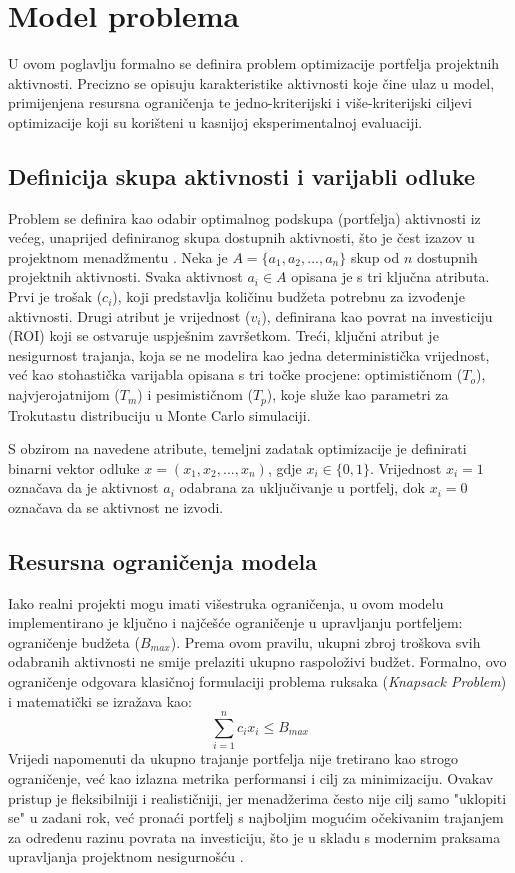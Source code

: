 \section{Model problema}
\label{chap:model_problema}

U ovom poglavlju formalno se definira problem optimizacije portfelja projektnih aktivnosti. Precizno se opisuju karakteristike aktivnosti koje čine ulaz u model, primijenjena resursna ograničenja te jedno-kriterijski i više-kriterijski ciljevi optimizacije koji su korišteni u kasnijoj eksperimentalnoj evaluaciji.

\subsection{Definicija skupa aktivnosti i varijabli odluke}
Problem se definira kao odabir optimalnog podskupa (portfelja) aktivnosti iz većeg, unaprijed definiranog skupa dostupnih aktivnosti, što je čest izazov u projektnom menadžmentu \cite{PMI2021, Kerzner2017}. Neka je $A=\{a_1, a_2, ..., a_n\}$ skup od $n$ dostupnih projektnih aktivnosti. Svaka aktivnost $a_i \in A$ opisana je s tri ključna atributa. Prvi je trošak ($c_i$), koji predstavlja količinu budžeta potrebnu za izvođenje aktivnosti. Drugi atribut je vrijednost ($v_i$), definirana kao povrat na investiciju (ROI) koji se ostvaruje uspješnim završetkom. Treći, ključni atribut je nesigurnost trajanja, koja se ne modelira kao jedna deterministička vrijednost, već kao stohastička varijabla opisana s tri točke procjene: optimističnom ($T_o$), najvjerojatnijom ($T_m$) i pesimističnom ($T_p$), koje služe kao parametri za Trokutastu distribuciju u Monte Carlo simulaciji.

S obzirom na navedene atribute, temeljni zadatak optimizacije je definirati binarni vektor odluke $x=(x_1, x_2, ..., x_n)$, gdje $x_i \in \{0,1\}$. Vrijednost $x_i=1$ označava da je aktivnost $a_i$ odabrana za uključivanje u portfelj, dok $x_i=0$ označava da se aktivnost ne izvodi.

\subsection{Resursna ograničenja modela}
Iako realni projekti mogu imati višestruka ograničenja, u ovom modelu implementirano je ključno i najčešće ograničenje u upravljanju portfeljem: ograničenje budžeta ($B_{max}$). Prema ovom pravilu, ukupni zbroj troškova svih odabranih aktivnosti ne smije prelaziti ukupno raspoloživi budžet. Formalno, ovo ograničenje odgovara klasičnoj formulaciji problema ruksaka (\textit{Knapsack Problem}) \cite{Kellerer2004} i matematički se izražava kao:
$$
\sum_{i=1}^n c_i x_i \leq B_{max}
$$
Vrijedi napomenuti da ukupno trajanje portfelja nije tretirano kao strogo ograničenje, već kao izlazna metrika performansi i cilj za minimizaciju. Ovakav pristup je fleksibilniji i realističniji, jer menadžerima često nije cilj samo "uklopiti se" u zadani rok, već pronaći portfelj s najboljim mogućim očekivanim trajanjem za određenu razinu povrata na investiciju, što je u skladu s modernim praksama upravljanja projektnom nesigurnošću \cite{Smith2014}.

